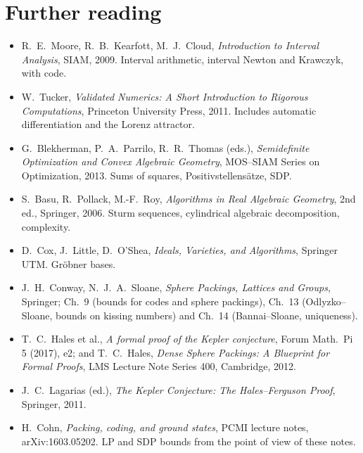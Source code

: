 \section*{Further reading}
\begin{itemize}[nosep]
\item R.~E.~Moore, R.~B.~Kearfott, M.~J.~Cloud, \emph{Introduction to Interval Analysis}, SIAM, 2009. Interval
  arithmetic, interval Newton and Krawczyk, with code.
\item W.~Tucker, \emph{Validated Numerics: A Short Introduction to Rigorous Computations}, Princeton University
  Press, 2011. Includes automatic differentiation and the Lorenz attractor.
\item G.~Blekherman, P.~A.~Parrilo, R.~R.~Thomas (eds.), \emph{Semidefinite Optimization and Convex Algebraic
  Geometry}, MOS--SIAM Series on Optimization, 2013. Sums of squares, Positivstellens\"atze, SDP.
\item S.~Basu, R.~Pollack, M.-F.~Roy, \emph{Algorithms in Real Algebraic Geometry}, 2nd ed., Springer, 2006.
  Sturm sequences, cylindrical algebraic decomposition, complexity.
\item D.~Cox, J.~Little, D.~O'Shea, \emph{Ideals, Varieties, and Algorithms}, Springer UTM. Gr\"obner bases.
\item J.~H.~Conway, N.~J.~A.~Sloane, \emph{Sphere Packings, Lattices and Groups}, Springer; Ch.~9 (bounds for
  codes and sphere packings), Ch.~13 (Odlyzko--Sloane, bounds on kissing numbers) and Ch.~14 (Bannai--Sloane,
  uniqueness).
\item T.~C.~Hales et al., \emph{A formal proof of the Kepler conjecture}, Forum Math.\ Pi 5 (2017), e2; and
  T.~C.~Hales, \emph{Dense Sphere Packings: A Blueprint for Formal Proofs}, LMS Lecture Note Series 400, Cambridge,
  2012.
\item J.~C.~Lagarias (ed.), \emph{The Kepler Conjecture: The Hales--Ferguson Proof}, Springer, 2011.
\item H.~Cohn, \emph{Packing, coding, and ground states}, PCMI lecture notes, arXiv:1603.05202. LP and SDP bounds
  from the point of view of these notes.
\end{itemize}
